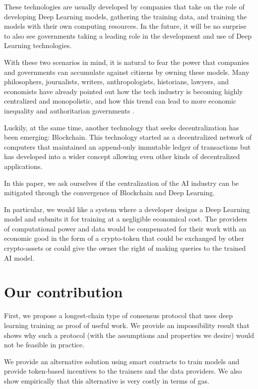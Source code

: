 \documentclass[conference]{IEEEtran}
\begin{document}
These technologies are usually developed by companies that take on the role of developing Deep Learning models, gathering the training data, and training the models with their own computing resources. In the future, it will be no surprise to also see governments taking a leading role in the development and use of Deep Learning technologies.

With these two scenarios in mind, it is natural to fear the power that companies and governments can accumulate against citizens by owning these models. Many philosophers, journalists, writers, anthropologists, historians, lawyers, and economists have already pointed out how the tech industry is becoming highly centralized and monopolistic, and how this trend can lead to more economic inequality and authoritarian governments \cite{b1} \cite{b2} \cite{b3} \cite{b4}.

Luckily, at the same time, another technology that seeks decentralization has been emerging: Blockchain. This technology started as a decentralized network of computers that maintained an append-only immutable ledger of transactions \cite{b6} but has developed into a wider concept allowing even other kinds of decentralized applications.

In this paper, we ask ourselves if the centralization of the AI industry can be mitigated through the convergence of Blockchain and Deep Learning.

In particular, we would like a system where a developer designs a Deep Learning model and submits it for training at a negligible economical cost. The providers of computational power and data would be compensated for their work with an economic good in the form of a crypto-token that could be exchanged by other crypto-assets or could give the owner the right of making queries to the trained AI model.

\section{Our contribution}
First, we propose a longest-chain type of consensus protocol that uses deep learning training as proof of useful work. We provide an impossibility result that shows why such a protocol (with the assumptions and properties we desire) would not be feasible in practice.

We provide an alternative solution using smart contracts to train models and provide token-based incentives to the trainers and the data providers. We also show empirically that this alternative is very costly in terms of gas.
\end{document}
